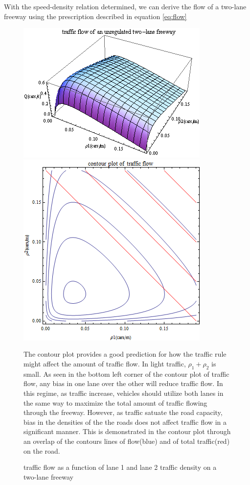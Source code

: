 	With the speed-density relation determined, we can derive the flow of a two-lane freeway using the prescription described in equation \ref{eq:flow}
	\begin{figure}
	\includegraphics[scale=.6]{plot/unregulated_flow}
	\includegraphics[scale=.45]{plot/contour_flow}
	\caption{traffic flow as a function of lane 1 and lane 2 traffic density on a two-lane freeway}
	The contour plot provides a good prediction for how the traffic rule might affect the amount of traffic flow. In light traffic, $\rho_1+\rho_2$ is small. As seen in the bottom left corner of the contour plot of traffic flow, any bias in one lane over the other will reduce traffic flow. In this regime, as traffic increase, vehicles should utilize both lanes in the same way to maximize the total amount of traffic flowing through the freeway. However, as traffic satuate the road capacity, bias in the densities of the the roads does not affect traffic flow in a significant manner. This is demonstrated in the contour plot through an overlap of the contours lines of flow(blue) and of total traffic(red) on the road.
	\end{figure}